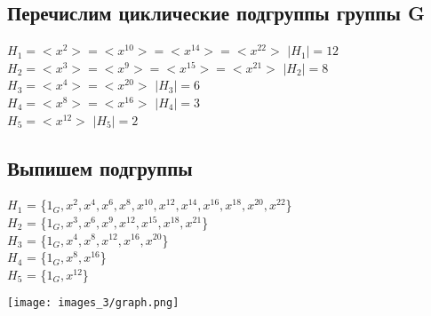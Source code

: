 \documentclass[a4paper, 12pt]{article}
\begin{document}
        \subsection*{Перечислим циклические подгруппы группы G}
            $H_1 = <x^2> = <x^{10}> = <x^{14}> = <x^{22}>$ $|H_1| = 12$\\
            $H_2 = <x^3> = <x^9> = <x^{15}> = <x^{21}>$ $|H_2| = 8$\\
            $H_3 = <x^4> = <x^{20}>$ $|H_3| = 6$\\
            $H_4 = <x^8> = <x^{16}>$ $|H_4| = 3$\\
            $H_5 = <x^{12}>$ $|H_5| = 2$\\
        \subsection*{Выпишем подгруппы}
            $H_1$ = \{$1_G, x^{2}, x^{4}, x^{6}, x^{8}, x^{10}, x^{12}, x^{14}, x^{16}, x^{18}, x^{20}, x^{22}$\}\\
            $H_2$ = \{$1_G, x^{3}, x^{6}, x^{9}, x^{12}, x^{15}, x^{18}, x^{21}$\}\\
            $H_3$ = \{$1_G, x^{4}, x^{8}, x^{12}, x^{16}, x^{20}$\}\\
            $H_4$ = \{$1_G, x^{8}, x^{16}$\}\\
            $H_5$ = \{$1_G, x^{12}$\}\\
        \begin{center}
            \texttt{[image: images\_3/graph.png]}    
        \end{center}
        
\end{document}
